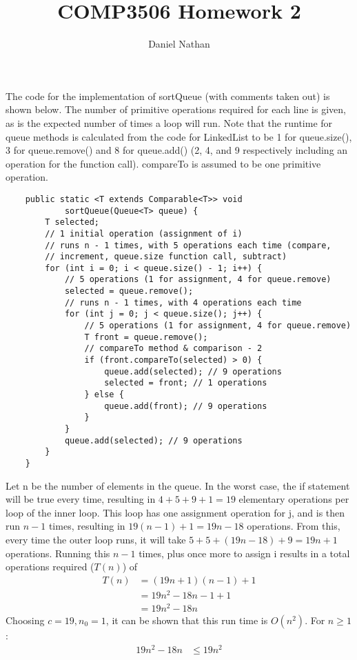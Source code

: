 \documentclass{article}
\author{Daniel Nathan}
\title{COMP3506 Homework 2}
\begin{document}
	\maketitle

	The code for the implementation of sortQueue (with comments taken out) is shown below. The number of primitive operations required for each line is given, as is the expected number of times a loop will run. Note that the runtime for queue methods is calculated from the code for LinkedList to be 1 for queue.size(), 3 for queue.remove() and 8 for queue.add() (2, 4, and 9 respectively including an operation for the function call). compareTo is assumed to be one primitive operation.
	\begin{lstlisting}
	public static <T extends Comparable<T>> void 
			sortQueue(Queue<T> queue) {
		T selected;
		// 1 initial operation (assignment of i)
		// runs n - 1 times, with 5 operations each time (compare,
		// increment, queue.size function call, subtract)
		for (int i = 0; i < queue.size() - 1; i++) {
			// 5 operations (1 for assignment, 4 for queue.remove)
			selected = queue.remove(); 
			// runs n - 1 times, with 4 operations each time
			for (int j = 0; j < queue.size(); j++) { 
				// 5 operations (1 for assignment, 4 for queue.remove)
				T front = queue.remove(); 
				// compareTo method & comparison - 2
				if (front.compareTo(selected) > 0) {
					queue.add(selected); // 9 operations
					selected = front; // 1 operations
				} else {
					queue.add(front); // 9 operations
				}
			}
			queue.add(selected); // 9 operations
		}
	}
	\end{lstlisting}
	Let n be the number of elements in the queue. In the worst case, the if statement will be true every time, resulting in $4 + 5 + 9 + 1 = 19$ elementary operations per loop of the inner loop. This loop has one assignment operation for j, and is then run $n - 1$ times, resulting in $19(n - 1) + 1 = 19n - 18$ operations. From this, every time the outer loop runs, it will take $5 + 5 + (19n - 18) + 9 = 19n + 1$ operations. Running this $n - 1$ times, plus once more to assign i results in a total operations required ($T(n)$) of 
	\begin{align*}
		T(n) &= (19n + 1)(n - 1) + 1 \\
		&= 19n^2 - 18n - 1 + 1 \\
		&= 19n^2 - 18n
	\end{align*}
	Choosing $c = 19, n_0 = 1$, it can be shown that this run time is $O(n^2)$. For $n \ge 1$:
	\begin{align*}
		19n^2 - 18n &\le 19n^2 
	\end{align*}
\end{document}
